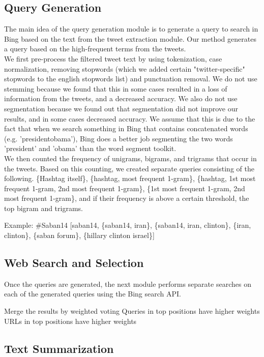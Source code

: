 \documentclass{sig-alternate}
\begin{document}
\subsection{Query Generation}
The main idea of the query generation module is to generate a query to search in Bing based on the text from the tweet extraction module. Our method generates a query based on the high-frequent terms from the tweets.\\
We first pre-process the filtered tweet text by using tokenization, case normalization, removing stopwords (which we added certain "twitter-specific" stopwords to the english stopwords list) and punctuation removal. We do not use stemming because we found that this in some cases resulted in a loss of information from the tweets, and a decreased accuracy. We also do not use segmentation because we found out that segmentation did not improve our results, and in some cases decreased accuracy. We assume that this is due to the fact that when we search something in Bing that contains concatenated words (e.g. 'presidentobama'), Bing does a better job segmenting the two words 'president' and 'obama' than the word segment toolkit. \\
We then counted the frequency of unigrams, bigrams, and trigrams that occur in the tweets. Based on this counting, we created separate queries consisting of the following. \{Hashtag itself\}, \{hashtag, most frequent 1-gram\}, \{hashtag, 1st most frequent 1-gram, 2nd most frequent 1-gram\},  \{1st most frequent 1-gram, 2nd most frequent 1-gram\}, and if their frequency is above a certain threshold, the top bigram and trigrams.

Example:
\#Saban14   [saban14, \{saban14, iran\}, \{saban14, iran, clinton\},  \{iran, clinton\}, \{saban forum\}, \{hillary clinton israel\}]

\subsection{Web Search and Selection}
Once the queries are generated, the next module performs separate searches on each of the generated queries using the Bing search API.

Merge the results by weighted voting
Queries in top positions have higher weights
URLs in top positions have higher weights

\subsection{Text Summarization}
\end{document}
